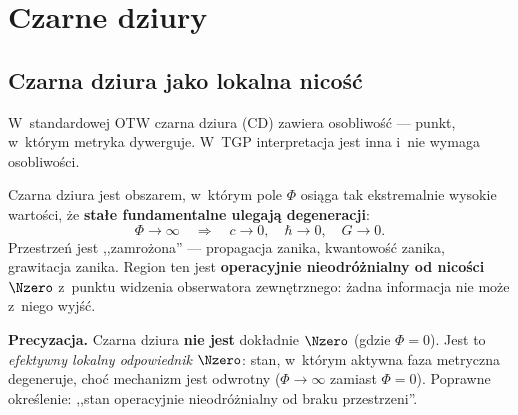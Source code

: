 \section{Czarne dziury}\label{sec:czarne}

\subsection{Czarna dziura jako lokalna nico\'s\'c}\label{ssec:cd-N0}

W~standardowej OTW czarna dziura (CD) zawiera osobliwo\'s\'c ---
punkt, w~kt\'orym metryka dywerguje. W~TGP interpretacja jest
inna i~nie wymaga osobliwo\'sci.

\begin{proposition}\label{prop:cd}
Czarna dziura jest obszarem, w~kt\'orym pole $\Phi$ osi\k{a}ga
tak ekstremalnie wysokie warto\'sci, \.ze \textbf{sta\l{}e
fundamentalne ulegaj\k{a} degeneracji}:
\begin{equation}
    \Phi \to \infty
    \quad\Longrightarrow\quad
    c \to 0,\quad \hbar \to 0,\quad G \to 0.
\end{equation}
Przestrze\'n jest ,,zamro\.zona'' --- propagacja zanika,
kwantowo\'s\'c zanika, grawitacja zanika. Region ten jest
\textbf{operacyjnie nieodr\'o\.znialny od nico\'sci $\Nzero$}
z~punktu widzenia obserwatora zewn\k{e}trznego: \.zadna
informacja nie mo\.ze z~niego wyj\'s\'c.

\medskip\noindent\textbf{Precyzacja.}
Czarna dziura \textbf{nie jest} dok\l{}adnie $\Nzero$
(gdzie $\Phi = 0$). Jest to \emph{efektywny lokalny
odpowiednik} $\Nzero$: stan, w~kt\'orym aktywna faza
metryczna degeneruje, cho\'c mechanizm jest odwrotny
($\Phi \to \infty$ zamiast $\Phi = 0$).
Poprawne okre\'slenie: ,,stan operacyjnie nieodr\'o\.znialny
od braku przestrzeni''.
\end{proposition}

